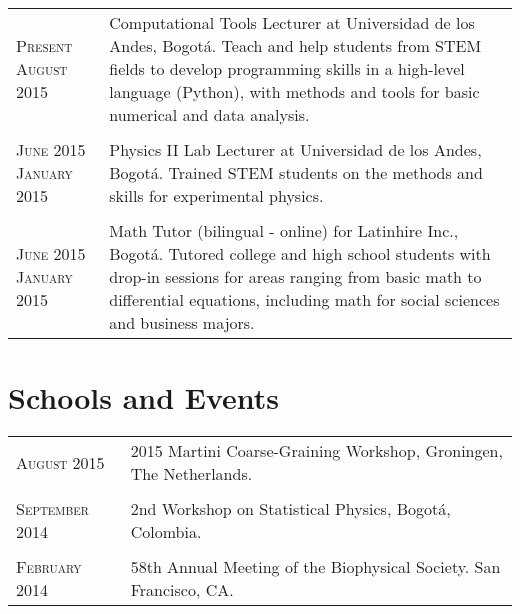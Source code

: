 \documentclass[a4paper,10pt]{article} %
\begin{document}
\begin{longtable}{p{2.4cm}p{11.7cm}}
\textsc{Present} \newline \textsc{August 2015} & Computational Tools Lecturer at Universidad de los Andes, Bogot\'a. 
\newline Teach and help students from STEM fields to develop programming skills in a high-level language (Python), with methods and tools for basic numerical and data analysis. \\
\\
\textsc{June 2015} \newline \textsc{January 2015} & Physics II Lab Lecturer at Universidad de los Andes, Bogot\'a. 
\newline Trained STEM students on the methods and skills for experimental physics.\\
\\
\textsc{June 2015} \newline \textsc{January 2015} & Math Tutor (bilingual - online) for Latinhire Inc., Bogot\'a. 
\newline Tutored college and high school students with drop-in sessions for areas ranging from basic math to differential equations, including math for social sciences and business majors. 
\end{longtable}


\color{OrangeRed}
\section{Schools and Events}
\color{black}

\begin{tabular}{ll}
\textsc{August 2015} & 2015 Martini Coarse-Graining Workshop, Groningen, The Netherlands. \\
\\
\textsc{September 2014} &  2nd Workshop on Statistical Physics, Bogotá, Colombia. \\
\\
\textsc{February 2014} &  58th Annual Meeting of the Biophysical Society. San Francisco, CA.
\end{tabular}

\end{document}
